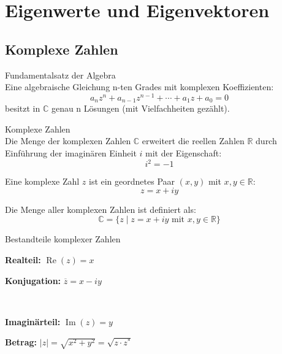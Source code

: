 \section{Eigenwerte und Eigenvektoren}

\subsection{Komplexe Zahlen}

\begin{lemma}{Fundamentalsatz der Algebra}\\
Eine algebraische Gleichung n-ten Grades mit komplexen Koeffizienten:
$$a_nz^n + a_{n-1}z^{n-1} + \cdots + a_1z + a_0 = 0$$
besitzt in $\mathbb{C}$ genau n Lösungen (mit Vielfachheiten gezählt).
\end{lemma}

\begin{concept}{Komplexe Zahlen}\\
Die Menge der komplexen Zahlen $\mathbb{C}$ erweitert die reellen Zahlen $\mathbb{R}$ durch Einführung der imaginären Einheit $i$ mit der Eigenschaft:
$$i^2 = -1$$

Eine komplexe Zahl $z$ ist ein geordnetes Paar $(x,y)$ mit $x,y \in \mathbb{R}$:
$$z = x + iy$$

Die Menge aller komplexen Zahlen ist definiert als:
$$\mathbb{C} = \{z \mid z = x + iy \text{ mit } x,y \in \mathbb{R}\}$$
\end{concept}

\begin{definition}{Bestandteile komplexer Zahlen}
\vspace{1mm}\\
\begin{minipage}[t]{0.45\textwidth}
    \textbf{Realteil:} $\operatorname{Re}(z) = x$
\end{minipage}
\begin{minipage}[t]{0.5\textwidth}
    \textbf{Konjugation:} $\overline{z} = x - iy$
\end{minipage}
\vspace{2mm}\\
\begin{minipage}[t]{0.45\textwidth}
    \textbf{Imaginärteil:} $\operatorname{Im}(z) = y$
\end{minipage}
\begin{minipage}[t]{0.53\textwidth}
    \textbf{Betrag:} $|z| = \sqrt{x^2 + y^2} = \sqrt{z \cdot z^*}$
\end{minipage}
\end{definition}

